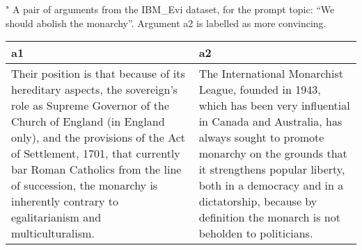 \centering
\caption{"
              A pair of arguments from the IBM\_Evi dataset, 
              for the prompt topic: ``We should abolish the monarchy''. 
              Argument a2 is labelled as more convincing.
              }
\begin{tabular}{p{6cm}|p{6cm}}
\toprule
                                                                                                                                                                                                                                                                                                                                                  a1 &                                                                                                                                                                                                                                                                                                                     a2 \\
\midrule
 [REF] Their position is that because of its hereditary aspects, the sovereign's role as Supreme Governor of the Church of England (in England only), and the provisions of the Act of Settlement, 1701, that currently bar Roman Catholics from the line of succession, the monarchy is inherently contrary to egalitarianism and multiculturalism. &  The International Monarchist League, founded in 1943, which has been very influential in Canada and Australia, has always sought to promote monarchy on the grounds that it strengthens popular liberty, both in a democracy and in a dictatorship, because by definition the monarch is not beholden to politicians. \\
\bottomrule
\end{tabular}

